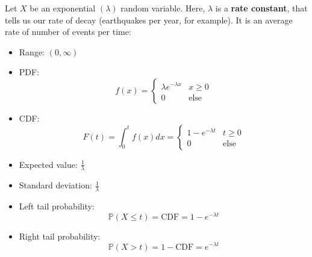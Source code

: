 \documentclass[titlepage, 12pt, leqno]{article}
\begin{document}
Let $X$ be an exponential $(\lambda)$ random variable. Here, $\lambda$ is a 
\textbf{rate constant}, that tells us our rate of decay (earthquakes per year, 
for example). It is an average rate of number of events per time:
\begin{itemize}
    \item Range: $(0,\infty)$
    \item PDF:
        \[
            f(x) = 
            \begin{cases}
                \lambda e^{-\lambda x} & x \ge 0 \\
                0 & \text{else}
            \end{cases}
        \]
    \item CDF:
        \[
            F(t) = \int_{0}^{t}f(x)dx =
            \begin{cases}
                1-e^{-\lambda t} & t \ge 0 \\
                0 & \text{else}
            \end{cases}
        \]
    \item Expected value: $\frac{1}{\lambda}$
    \item Standard deviation: $\frac{1}{\lambda}$
    \item Left tail probability:
        \[
            \mathbb{P}(X \le t) = \text{CDF} = 1 - e^{-\lambda t}
        \]
    \item Right tail probability:
        \[
            \mathbb{P}(X > t) = 1 - \text{CDF} = e^{-\lambda t}
        \]
\end{itemize}
\end{document}
